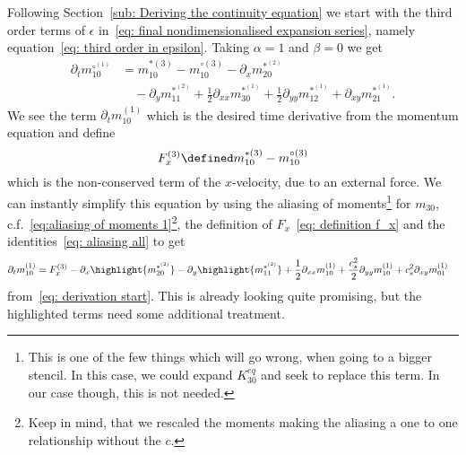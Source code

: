 Following Section~\ref{sub: Deriving the continuity equation} we start with the third order terms of
$\epsilon$ in~\eqref{eq: final nondimensionalised expansion series}, namely equation~\eqref{eq: third order in epsilon}.
Taking $\alpha=1$ and $\beta=0$ we get
\begin{equation}
  \label{eq: derivation start}
  \begin{aligned}
     \partial_t m_{10}^{\circ^{(1)}} & =
    m_{10}^{*(3)} - m_{10}^{\circ{(3)}} - \partial_x m_{20}^{*^{(2)}} \\
    &\quad - \partial_y m_{11}^{*^{(2)}} + \frac{1}{2}\partial_{xx} m_{30}^{*^{(1)}} + \frac{1}{2} \partial_{yy} m_{12}^{*^{(1)}} + \partial_{xy} m_{21}^{*^{(1)}}.
  \end{aligned}
\end{equation}
We see the term $\partial_t m_{10}^{(1)} $ which is the desired time derivative from the momentum equation and define
\begin{equation}
  \label{eq: definition f_x}
   F_x^{(3)}\defined m_{10}^{*(3)} - m_{10}^{\circ{(3)}}
\end{equation}
which is the non-conserved term of the $x$-velocity, due to an external force.
We can instantly simplify this equation by using the aliasing of moments\footnote{This is one of the few things which will go wrong, when going to a bigger stencil.
In this case, we could expand $K_{30}^{eq}$ and seek to replace this term.
In our case though, this is not needed.} for $m_{30}$, c.f.~\eqref{eq:aliasing of moments 1}\footnote{Keep in mind, that we rescaled the moments making the aliasing a one to one relationship without the $c$.}, the definition of $F_x$~\eqref{eq: definition f_x} and the identities~\eqref{eq: aliasing all} to get
\begin{equation}
  \label{eq: start of momentum equation derivation}
  \begin{aligned}
    \partial_t m_{10}^{(1)} & =
    F_x^{(3)} - \partial_x \highlight{m_{20}^{*^{(2)}}} - \partial_y \highlight{m_{11}^{*^{(2)}}} + \frac{1}{2}\partial_{xx} m_{10}^{(1)} + \frac{c_s^2}{2} \partial_{yy} m_{10}^{(1)} + c_s^2\partial_{xy} m_{01}^{(1)}
  \end{aligned}
\end{equation}
from~\eqref{eq: derivation start}.
This is already looking quite promising, but the highlighted terms need some additional treatment.

